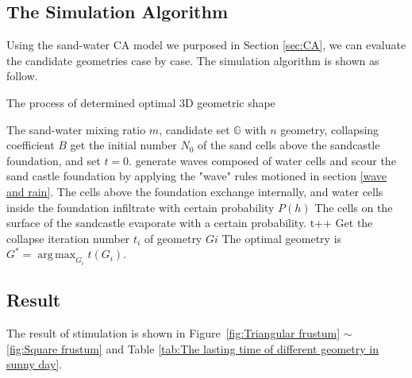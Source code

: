 \documentclass{mcmthesis}		    %
\DeclareMathOperator*{\argmax}{arg\,max}
\begin{document}
	\subsection{The Simulation Algorithm}
	Using the sand-water CA model we purposed in Section \ref{sec:CA}, we can evaluate the candidate geometries case by case. The simulation algorithm is shown as follow.
\begin{algorithm}[htbp!]
	\caption{\small{The process of determined optimal 3D geometric shape}}
    	\begin{algorithmic}[1]\small
    		\REQUIRE The sand-water mixing ratio $m$, candidate set $\mathbb{G}$ with $n$ geometry, collapsing coefficient $B$
            \STATE get the initial number $N_0$ of the sand cells above the sandcastle foundation, and set $t=0$.
            \STATE generate waves composed of water cells and scour the sand castle foundation by applying the "wave" rules motioned in section \ref{wave and rain}.
            \STATE The cells above the foundation exchange internally, and water cells inside the foundation infiltrate with certain probability $P(h)$
            \STATE The cells on the surface of the sandcastle evaporate with a certain probability.
            \STATE t++
            \ENDWHILE
            \STATE Get the collapse iteration number $t_i$ of geometry $Gi$ 
            \ENDFOR
            \STATE The optimal geometry is $G^{*} = \argmax_{G_i} t(G_i)$.
    	\end{algorithmic}
		\label{algorithm1}
\end{algorithm}
	
      	\subsection{Result}
     The result of stimulation is shown in Figure~\ref{fig:Triangular frustum} $\sim$ \ref{fig:Square frustum} and Table \ref{tab:The lasting time of different geometry in sunny day}.
     
\end{document}
